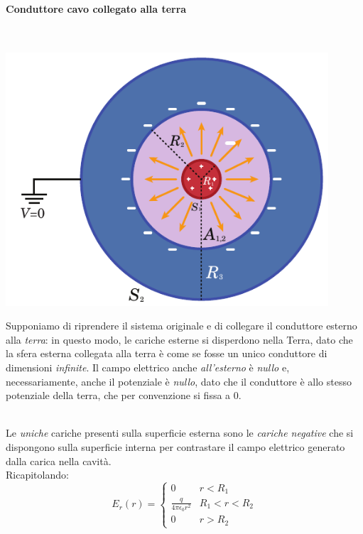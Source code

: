 \paragraph{Conduttore cavo collegato alla terra}~\\
\begin{minipage}{0.43\textwidth}
	\begin{center}
		\includegraphics[width=0.9\textwidth]{images/chp4/chp4sferacavaconsferaterra.pdf}
	\end{center}
\end{minipage}\hspace{5pt}
\begin{minipage}{0.56\textwidth}
Supponiamo di riprendere il sistema originale e di collegare il conduttore esterno alla \textit{terra}: in questo modo, le cariche esterne si disperdono nella Terra, dato che la sfera esterna collegata alla terra è come se fosse un unico conduttore di dimensioni \textit{infinite}. Il campo elettrico anche \textit{all'esterno} è \textit{nullo} e, necessariamente, anche il potenziale è \textit{nullo}, dato che il conduttore è allo stesso potenziale della terra, che per convenzione si fissa a $0$.
\end{minipage}\\
Le \textit{uniche} cariche presenti sulla superficie esterna sono le \textit{cariche negative} che si dispongono sulla superficie interna per contrastare il campo elettrico generato dalla carica nella cavità.\\
Ricapitolando:
\begin{equation*}
	E_{r}(r)=\begin{cases}
		0 & r<R_1\\
		\frac{q}{4\pi\epsilon_0 r^2} & R_1<r<R_2\\
		0 & r>R_2
	\end{cases}
\end{equation*}
